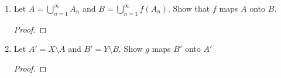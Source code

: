 \begin{enumerate}
\begin{enumerate}
\begin{proof}
        \[ A_{k-1} = A_{k-1} \setminus g(f(A_{k-1})) = \{  x \in A_{k-1} : x \notin g(f(A_{k-1})) \}.\]
        But notice that \( g(f(A_{k-1})) = A_k\) which tells us that  \( A_{k-1} \cap A_{k} \) are also pairwise disjoint. 
        Thus, \( A_n \) for each \( n \in \N \) is pairwise disjoint.

    \end{proof}
    \item Let \( A = \bigcup_{n=1}^{ \infty } A_n \) and \( B  = \bigcup_{n=1}^{\infty } f(A_n) \). Show that \( f \) maps \( A \) onto \( B \).

    \begin{proof}
        
    \end{proof}
    \item Let \( A' = X \setminus A \) and \( B' = Y \setminus B  \). Show \( g \) maps \( B' \) onto \( A'\)
        \begin{proof}
        
        \end{proof}
\end{enumerate} 





\end{enumerate}







